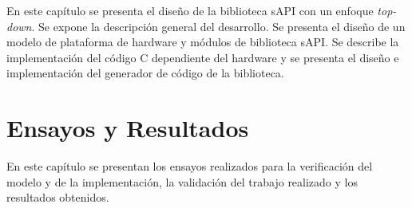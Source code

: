 \documentclass[
11pt, %
spanish,
singlespacing, %
parskip, %
headsepline, %
]{MastersDoctoralThesis} %
\begin{document}
En este capítulo se presenta el diseño de la biblioteca sAPI con un enfoque \emph{top-down}. Se expone la descripción general del desarrollo. Se presenta el diseño de un modelo de plataforma de hardware y módulos de biblioteca sAPI. Se describe la implementación del código C dependiente del hardware y se presenta el diseño e implementación del generador de código de la biblioteca.





 



 

%


%
%
%
%
%

\chapter{Ensayos y Resultados}
\label{ChapterEnsayosYResultados}

En este capítulo se presentan los ensayos realizados para la verificación del modelo y de la implementación, la validación del trabajo realizado y los resultados obtenidos.







\end{document}
